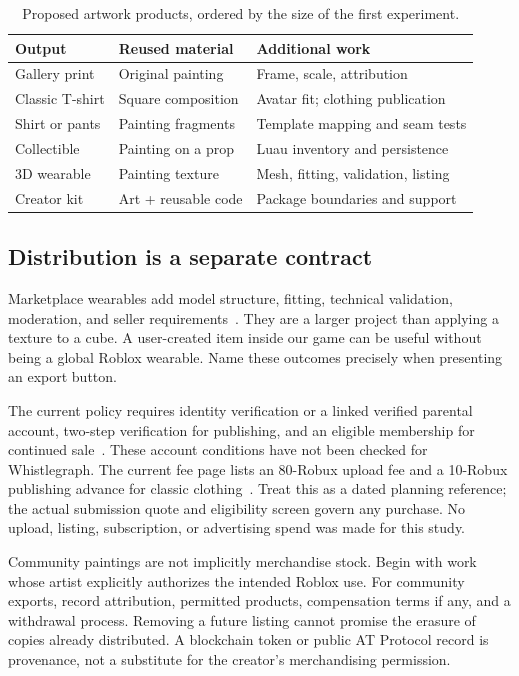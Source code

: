 \documentclass[10pt,letterpaper,twocolumn]{article}
\begin{document}
\begin{table}[t]
\centering\small
\caption{Proposed artwork products, ordered by the size of the first experiment.}
\label{tab:wares}
\begin{tabularx}{\columnwidth}{@{}p{}YY@{}}
\toprule
Output & Reused material & Additional work \\
\midrule
Gallery print & Original painting & Frame, scale, attribution \\
Classic T-shirt & Square composition & Avatar fit; clothing publication \\
Shirt or pants & Painting fragments & Template mapping and seam tests \\
Collectible & Painting on a prop & Luau inventory and persistence \\
3D wearable & Painting texture & Mesh, fitting, validation, listing \\
Creator kit & Art + reusable code & Package boundaries and support \\
\bottomrule
\end{tabularx}
\end{table}

\subsection{Distribution is a separate contract}
Marketplace wearables add model structure, fitting, technical validation, moderation, and seller requirements~\cite{marketplace}. They are a larger project than applying a texture to a cube. A user-created item inside our game can be useful without being a global Roblox wearable. Name these outcomes precisely when presenting an export button.

The current policy requires identity verification or a linked verified parental account, two-step verification for publishing, and an eligible membership for continued sale~\cite{policy}. These account conditions have not been checked for Whistlegraph. The current fee page lists an 80-Robux upload fee and a 10-Robux publishing advance for classic clothing~\cite{fees}. Treat this as a dated planning reference; the actual submission quote and eligibility screen govern any purchase. No upload, listing, subscription, or advertising spend was made for this study.

Community paintings are not implicitly merchandise stock. Begin with work whose artist explicitly authorizes the intended Roblox use. For community exports, record attribution, permitted products, compensation terms if any, and a withdrawal process. Removing a future listing cannot promise the erasure of copies already distributed. A blockchain token or public AT Protocol record is provenance, not a substitute for the creator's merchandising permission.
\end{document}
